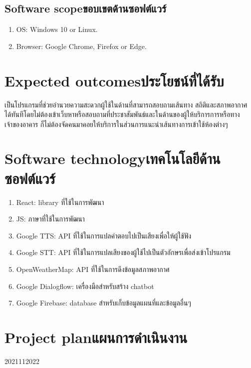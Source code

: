 \subsection{\ifenglish Software scope\else ขอบเขตด้านซอฟต์แวร์\fi}
\begin{enumerate}
    \item OS: Windows 10 or Linux.
    \item Browser: Google Chrome, Firefox or Edge.
\end{enumerate}

\section{\ifenglish Expected outcomes\else ประโยชน์ที่ได้รับ\fi}
เป็นโปรแกรมที่ช่วยอำนวยความสะดวกผู้ใช้ในด้านที่สามารถสอบถามเส้นทาง สถิติและสภาพอากาศ 
ได้ทันทีโดยไม่ต้องเข้าเว็บหาหรือสอบถามที่ประชาสัมพันธ์และในด้านของผู้ให้บริการการหรือทางเจ้าของอาคาร
ก็ไม่ต้องจัดคนมาคอยให้บริการในส่วนการแนะนำเส้นทางการเข้าใช้ห้องต่างๆ 

\section{\ifenglish Software technology\else เทคโนโลยีด้านซอฟต์แวร์\fi}
\begin{enumerate}
    \item React: library ที่ใช้ในการพัฒนา
    \item JS: ภาษาที่ใช้ในการพัฒนา
    \item Google TTS: API ที่ใช้ในการแปลคำตอบไปเป็นเสียงเพื่อให้ผู้ใช้ฟัง
    \item Google STT: API ที่ใช้ในการแปลเสียงของผู้ใช้ไปเป็นตัวอักษรเพื่อส่งเข้าโปรแกรม
    \item OpenWeatherMap: API ที่ใช้ในการดึงข้อมูลสภาพอากาศ
    \item Google Dialogflow: เครื่องมือสำหรับสร้าง chatbot
    \item Google Firebase: database สำหรับเก็บข้อมูลแผนที่และข้อมูลอื่นๆ
\end{enumerate}

\section{\ifenglish Project plan\else แผนการดำเนินงาน\fi}

\begin{plan}{11}{2021}{11}{2022}
\end{plan}

